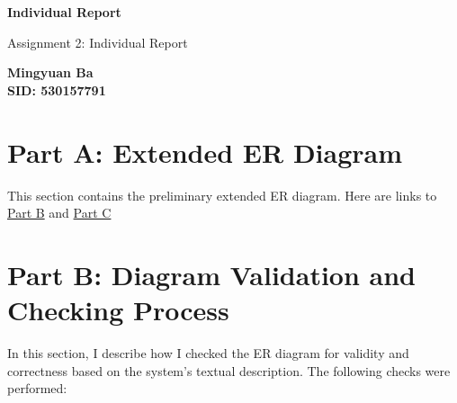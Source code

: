 \documentclass[a4paper,12pt]{article}
\begin{document}
\begin{titlepage}
    \centering
    \vspace*{2cm}
    
    \Huge
    \textbf{Individual Report}

    \vspace{1.5cm}

    \Large
    Assignment 2: Individual Report

    \vfill

    \textbf{Mingyuan Ba}\\
    \textbf{SID: 530157791}\\

    \vspace{0.8cm}

    \vfill
\end{titlepage}

\section*{Part A: Extended ER Diagram}
\noindent
This section contains the preliminary extended ER diagram. Here are links to \hyperlink{PartB}{Part B} and \hyperlink{PartC}{Part C}

% 

\newpage

\section*{Part B: Diagram Validation and Checking Process}
\hypertarget{PartB}{}
\noindent
In this section, I describe how I checked the ER diagram for validity and correctness based on the system's textual description. The following checks were performed:
\end{document}
